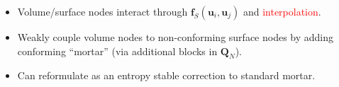 \documentclass[compress]{beamer}
\theoremstyle{plain}
\renewcommand{\note}[1]{\textcolor{red}{{#1}}}
\begin{document}
{{\begin{columns}
\end{columns}
\vspace{.5em}
}%


\begin{itemize}
\item<1-> Volume/surface nodes interact through $\bm{f}_S(\bm{u}_i,\bm{u}_j)$ and \note{interpolation}.
\vspace{.25em}
\item<2-> Weakly couple volume nodes to non-conforming surface nodes by adding conforming ``mortar'' (via additional blocks in $\bm{Q}_N$).
\vspace{.25em}
\item<2-> Can reformulate as an entropy stable correction to standard mortar.  
\end{itemize}

}
\end{document}
